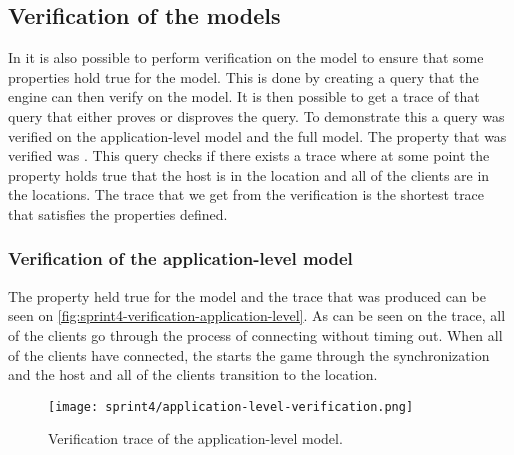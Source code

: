\subsection{Verification of the models}
In \uppaal it is also possible to perform verification on the model to ensure that some properties hold true for the model.
This is done by creating a query that the \uppaal engine can then verify on the model.
It is then possible to get a trace of that query that either proves or disproves the query.
To demonstrate this a query was verified on the application-level model and the full model.
The property that was verified was .
This query checks if there exists a trace where at some point the property holds true that the host is in the  location and all of the clients are in the  locations.
The trace that we get from the verification is the shortest trace that satisfies the properties defined.

\subsubsection{Verification of the application-level model}
The property held true for the model and the trace that was produced can be seen on \autoref{fig:sprint4-verification-application-level}.
As can be seen on the trace, all of the clients go through the process of connecting without timing out.
When all of the clients have connected, the  starts the game through the  synchronization and the host and all of the clients transition to the  location.
\begin{figure}[H]
    \centering
    \texttt{[image: sprint4/application-level-verification.png]}
    \caption{Verification trace of the application-level model.}
    \label{fig:sprint4-verification-application-level}
\end{figure}

